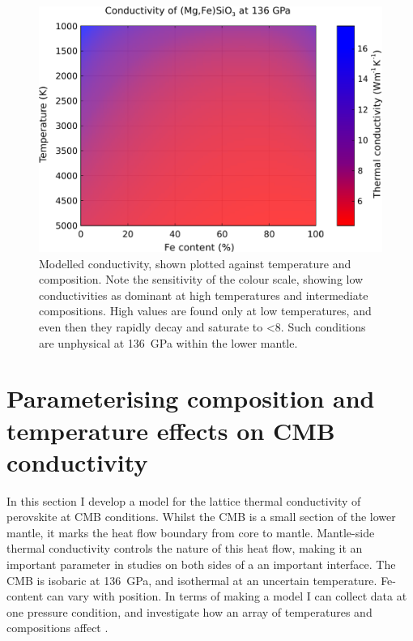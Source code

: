 \begin{figure}[h!]
  \includegraphics[width=\linewidth]{Figures/K_over_T_over_X.png}
  \caption[CONTENTS BIT]{Modelled conductivity, shown plotted against temperature and composition. Note the sensitivity of the colour scale, showing low conductivities as dominant at high temperatures and intermediate compositions. High values are found only at low temperatures, and even then they rapidly decay and saturate to <8\wmk. Such conditions are unphysical at 136~GPa within the lower mantle.}
  \label{fig:kappa-temp-comp_01}
\end{figure}



\section{\label{sec:kappa_model}Parameterising composition and temperature effects on CMB conductivity}

In this section I develop a model for the lattice thermal conductivity of \mgfesios perovskite at CMB conditions. Whilst the CMB is a small section of the lower mantle, it marks the heat flow boundary from core to mantle. Mantle-side thermal conductivity controls the nature of this heat flow, making it an important parameter in studies on both sides of a an important interface. The CMB is isobaric at 136~GPa, and isothermal at an uncertain temperature. Fe-content can vary with position. In terms of making a model I can collect data at one pressure condition, and investigate how an array of temperatures and compositions affect \tc.

